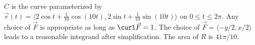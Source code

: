 {$C$ is the curve parameterized by $\vec r(t) = \langle 2\cos t+\frac1{10}\cos(10t),2\sin t+\frac1{10}\sin (10t)\rangle$ on $0\leq t\leq 2\pi$. 
}
{Any choice of $\vec F$ is appropriate as long as $\curl \vec F = 1$. The choice of  $\vec F = \langle -y/2,x/2\rangle$ leads to a reasonable integrand after simplification. The area of $R$ is $41\pi/10$.
}
